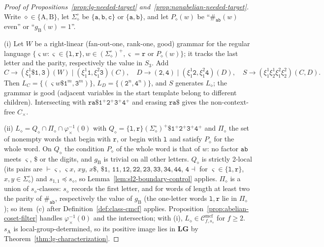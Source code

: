 \documentclass[11pt]{article}
\numberwithin{equation}{section}
\theoremstyle{plain}
\theoremstyle{definition}
\theoremstyle{remark}
\newcommand{\Cmcf}[2]{\mathcal{C}^{\mathrm{mcf}}_{#1,#2}}
\begin{document}
\begin{proof}[Proof of Propositions~\ref{prop:lg-needed-target}
and~\ref{prop:nonabelian-needed-target}]
Write $\diamond\in\{\mathrm A,\mathrm B\}$, let $\Sigma_\diamond^\circ$ be $\{\mathtt a,\mathtt b,
\mathtt c\}$ or $\{\mathtt a,\mathtt b\}$, and let $P_\diamond(w)$ be ``$\#_{\mathtt{ab}}(w)$
even'' or ``$g_{\mathrm B}(w)=1$''.

(i) Let $W$ be a right-linear (fan-out-one, rank-one, good) grammar for the regular
language $\{\varsigma w:\varsigma\in\{\mathtt l,\mathtt r\},w\in(\Sigma_\diamond^\circ)^+,
\varsigma=\mathtt r\text{ or }P_\diamond(w)\}$; it tracks the last letter and the parity,
respectively the value in $S_3$.  Add
\[
 C\to(\xi_1^1\mathtt\$\mathtt 1,\mathtt 3)(W)\mid(\xi_1^1\mathtt 1,\xi_1^2\mathtt 3)(C),\quad
 D\to(\mathtt 2,\mathtt 4)\mid(\xi_1^1\mathtt 2,\xi_1^2\mathtt 4)(D),\quad
 S\to(\xi_1^1\xi_2^1\xi_1^2\xi_2^2)(C,D).
\]
Then $L_C=\{(\varsigma w\mathtt\$\mathtt 1^m,\mathtt 3^m)\}$, $L_D=\{(\mathtt 2^n,\mathtt 4^n)\}$,
and $S$ generates $L_\diamond$; the grammar is good (adjacent variables in the start
template belong to different children).  Intersecting with
$\mathtt{ra\$}\mathtt 1^+\mathtt 2^+\mathtt 3^+\mathtt 4^+$ and erasing $\mathtt{ra\$}$
gives the non-context-free $C_\times$.

(ii) $L_\diamond=Q_\diamond\cap\Pi_\diamond\cap\varphi_\times^{-1}(0)$ with
$Q_\diamond=\{\mathtt l,\mathtt r\}(\Sigma_\diamond^\circ)^+\mathtt\$\mathtt 1^+\mathtt 2^+\mathtt 3^+
\mathtt 4^+$ and $\Pi_\diamond$ the set of nonempty words that begin with $\mathtt r$, or begin
with $\mathtt l$ and satisfy $P_\diamond$ for the whole word.  On $Q_\diamond$ the condition $P_\diamond$ of
the whole word is that of $w$: no factor $\mathtt{ab}$ meets $\varsigma$, $\mathtt\$$ or
the digits, and $g_{\mathrm B}$ is trivial on all other letters.  $Q_\diamond$ is strictly
2-local (its pairs are $\vdash\varsigma$, $\varsigma x$, $xy$, $x\mathtt\$$, $\mathtt{\$1}$,
$\mathtt{11},\mathtt{12},\mathtt{22},\mathtt{23},\mathtt{33},\mathtt{34},\mathtt{44}$,
$\mathtt 4\dashv$ for $\varsigma\in\{\mathtt l,\mathtt r\}$, $x,y\in\Sigma_\diamond^\circ$) and
$s_{1,1}\preceq s_\diamond$, so Lemma~\ref{lem:sl2-boundary-control} applies.  $\Pi_\diamond$ is a
union of $s_\diamond$-classes: $s_\diamond$ records the first letter, and for words of length at least
two the parity of $\#_{\mathtt{ab}}$, respectively the value of $g_{\mathrm B}$ (the
one-letter words $\mathtt l,\mathtt r$ lie in $\Pi_\diamond$); so item~(c) after
Definition~\ref{def:class-cmcf} applies.  Proposition~\ref{prop:abelian-coset-filter}
handles $\varphi_\times^{-1}(0)$ and the intersection; with (i),
$L_\diamond\in\Cmcf{f}{s_\diamond}$ for $f\ge2$.  $s_{\mathrm A}$ is local-group-determined, so its
positive image lies in $\mathbf{LG}$ by Theorem~\ref{thm:lg-characterization}.


\end{proof}
\end{document}
